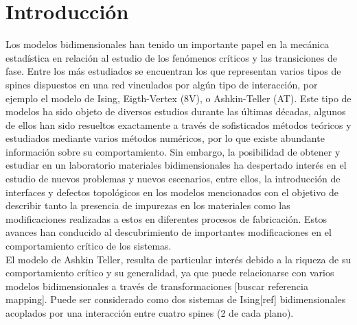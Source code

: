
\section{Introducci\'on}
\label{sec:intro}
Los modelos bidimensionales han tenido un importante papel en la mec\'anica estad\'istica en relaci\'on al estudio de los
 fen\'omenos cr\'iticos y las transiciones de fase. Entre los más estudiados se encuentran los que representan
 varios tipos de spines dispuestos en una red vinculados por algún tipo de interacción, por ejemplo el modelo de Ising, Eigth-Vertex (8V)\cite{model_8V},
 o Ashkin-Teller (AT)\cite{ashkin_teller_43}. Este tipo de modelos ha sido objeto de diversos estudios durante las últimas décadas,
 algunos de ellos han sido resueltos exactamente a través de sofisticados métodos teóricos y estudiados mediante varios
 métodos numéricos, por lo que existe abundante información sobre su comportamiento. Sin embargo, la posibilidad de obtener y estudiar en un laboratorio
 materiales bidimensionales \cite{exp_ultrathin_magfilms} ha despertado interés en el estudio de nuevos problemas y nuevos escenarios,
 entre ellos, la introducci\'on de interfaces y defectos topol\'ogicos en los modelos mencionados \cite{linear_defects2D, interf, interf_AT}
 con el objetivo de describir tanto la presencia de impurezas en los materiales como las modificaciones realizadas a estos en diferentes procesos
 de fabricaci\'on. Estos avances han conducido al descubrimiento de importantes modificaciones en el comportamiento cr\'itico de los sistemas.\\
El modelo de Ashkin Teller, resulta de particular inter\'es debido a la riqueza de su comportamiento cr\'itico y su generalidad, ya que puede relacionarse con
 varios modelos bidimensionales a trav\'es de transformaciones [buscar referencia mapping]. Puede ser considerado como dos sistemas de Ising[ref]
 bidimensionales acoplados por una interacci\'on entre cuatro spines (2 de cada plano).\\

